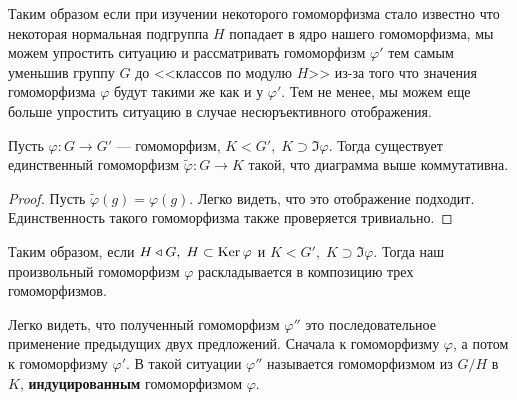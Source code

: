 \documentclass[../main.tex]{subfiles}
\begin{document}
Таким образом если при изучении некоторого гомоморфизма стало известно что некоторая нормальная подгруппа $H$ попадает в ядро нашего гомоморфизма, мы можем упростить ситуацию и рассматривать гомоморфизм $\varphi'$ тем самым уменьшив группу $G$ до <<классов по модулю $H$>> из-за того что значения гомоморфизма $\varphi$ будут такими же как и у $\varphi'$. Тем не менее, мы можем еще больше упростить ситуацию в случае несюръективного отображения.

\begin{figure}[ht]
    \centering
\end{figure}

\begin{theorem-non}
  \label{non:6.13}
  Пусть $\varphi\colon G \to G'$ --- гомоморфизм, $K < G', \; K \supset \Im \varphi$. Тогда существует единственный гомоморфизм $\widetilde{\varphi}\colon G \to K$ такой, что диаграмма выше коммутативна.
\end{theorem-non}
\begin{proof}
  Пусть $\widetilde{\varphi}(g) = \varphi(g)$. Легко видеть, что это отображение подходит. Единственность такого гомоморфизма также проверяется тривиально.
\end{proof}

  Таким образом, если $H \triangleleft G, \; H \subset \operatorname{Ker} \varphi$ и $K < G', \; K \supset \Im \varphi$. Тогда наш произвольный гомоморфизм $\varphi$ раскладывается в композицию трех гомоморфизмов.
\begin{figure}[ht]
    \centering
\end{figure}

  Легко видеть, что полученный гомоморфизм $\varphi''$ это последовательное применение предыдущих двух предложений. Сначала к гомоморфизму $\varphi$, а потом к гомоморфизму $\varphi'$. В такой ситуации $\varphi''$ называется гомоморфизмом из $G/H$ в $K$, \textbf{индуцированным} гомоморфизмом $\varphi$.
\end{document}
